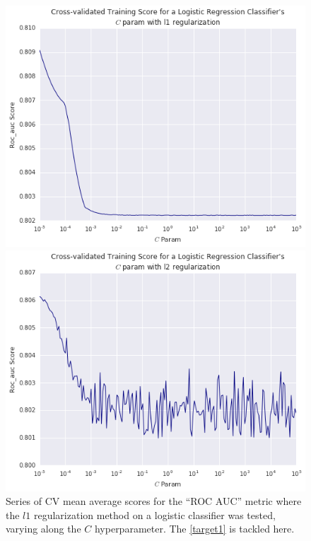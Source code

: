 \begin{figure}
\centering
\begin{minipage}{.5\textwidth}
  \includegraphics[width=.8\linewidth]{figures/cross_validation/logreg_cv_regularization_l1_rocauc_series}
\end{minipage}%
\begin{minipage}{.5\textwidth}
  \includegraphics[width=.8\linewidth]{figures/cross_validation/logreg_cv_regularization_l2_rocauc_series}
  \end{minipage}
\caption{Series of CV mean average scores for the ``ROC AUC'' metric where the $l1$ regularization method on a logistic classifier was tested, varying along the $C$ hyperparameter.
The \cref{target1} is tackled here.}\label{fig:rocauc_logreg_cv_regularized_comparison}
\end{figure}
